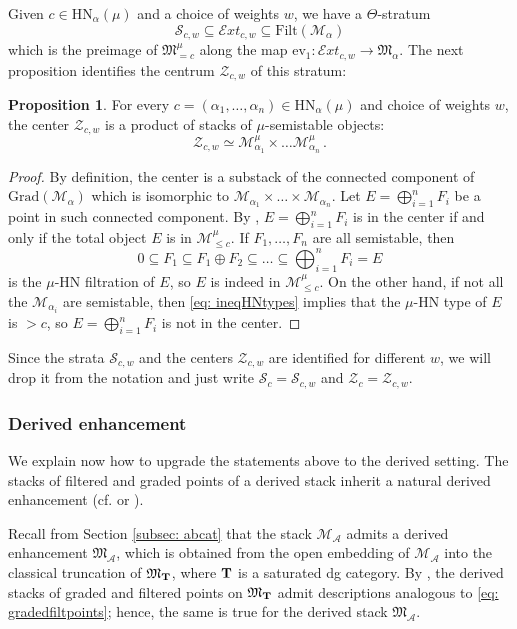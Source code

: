 \documentclass[12pt]{amsart}
\theoremstyle{definition}
\newtheorem{proposition}[definition]{Proposition}
\newcommand{\CA}{{\mathcal A}}
\newcommand{\CE}{{\mathcal E}}
\newcommand{\CM}{{\mathcal M}}
\newcommand{\CS}{{\mathcal S}}
\newcommand{\CZ}{{\mathcal Z}}
\newcommand{\1}{\mathbf 1}
\newcommand{\bfT}{{\bf T}}
\newcommand{\FM}{{\mathfrak{M}}}
\renewcommand{\ev}{\mathrm{ev}}
\newcommand{\HN}{\mathrm{HN}}
\newcommand{\Grad}{\mathrm{Grad}}
\newcommand{\Filt}{\mathrm{Filt}}
\begin{document}
Given $c\in \HN_\alpha(\mu)$ and a choice of weights $w$, we have a $\Theta$-stratum 
\[\CS_{c,w}\subseteq \CE xt_{c,w}\subseteq \Filt(\CM_\alpha)\]
which is the preimage of $\FM_{=c}^\mu$ along the map $\ev_1\colon \CE xt_{c,w}\to \FM_\alpha$. The next proposition identifies the centrum $\CZ_{c,w}$ of this stratum:

\begin{proposition}\label{prop: centers} For every $c=(\alpha_1, \ldots, \alpha_n)\in \HN_\alpha(\mu)$ and choice of weights $w$, the center $\CZ_{c,w}$ is a product of stacks of $\mu$-semistable objects:
\[\CZ_{c,w}\simeq \CM_{\alpha_1}^\mu\times \ldots \CM_{\alpha_n}^\mu\,.\]
\end{proposition}
\begin{proof}
By definition, the center is a substack of the connected component of $\Grad(\CM_\alpha)$ which is isomorphic to $\CM_{\alpha_1}\times \ldots \times \CM_{\alpha_n}$. Let $E=\bigoplus_{i=1}^n F_i$ be a point in such connected component. By \cite[Corollary 2.3.6]{HLstructure}, $E=\bigoplus_{i=1}^n F_i$ is in the center if and only if the total object $E$ is in $\CM_{\leq c}^\mu$. If $F_1, \ldots, F_n$ are all semistable, then
\[0\subseteq F_1\subseteq F_1\oplus F_2\subseteq \ldots\subseteq \bigoplus_{i=1}^n F_i=E\]
is the $\mu$-HN filtration of $E$, so $E$ is indeed in $\CM_{\leq c}^\mu$. On the other hand, if not all the $\CM_{\alpha_i}$ are semistable, then \eqref{eq: ineqHNtypes} implies that the $\mu$-HN type of $E$ is $>c$, so $E=\bigoplus_{i=1}^n F_i$ is not in the center.\qedhere
\end{proof}

Since the strata $\CS_{c,w}$ and the centers $\CZ_{c,w}$ are identified for different $w$, we will drop it from the notation and just write $\CS_c=\CS_{c,w}$ and $\CZ_c=\CZ_{c,w}$. 

\subsubsection{Derived enhancement}\label{subsubsec: derivedenhancementabelian}

We explain now how to upgrade the statements above to the derived setting. The stacks of filtered and graded points of a derived stack inherit a natural derived enhancement (cf. \cite[Theorem 5.1.1]{HLpreygel} or \cite[Theorem 1.2.1]{HLderived}).

Recall from Section \ref{subsec: abcat} that the stack $\CM_\CA$ admits a derived enhancement $\FM_\CA$, which is obtained from the open embedding of $\CM_\CA$ into the classical truncation of $\FM_{\bfT}$, where $\bfT$ is a saturated dg category. By \cite[Proposition 8.26]{KPS}, the derived stacks of graded and filtered points on $\FM_{\bfT}$ admit descriptions analogous to \eqref{eq: gradedfiltpoints}; hence, the same is true for the derived stack $\FM_\CA$. 
\end{document}
